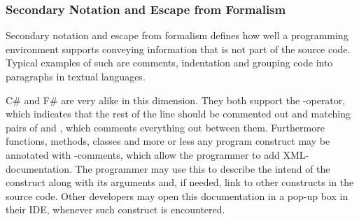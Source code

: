 \subsubsection{Secondary Notation and Escape from Formalism}
Secondary notation and escape from formalism defines how well a programming environment supports conveying information that is not part of the source code. Typical examples of such are comments, indentation and grouping code into paragraphs in textual languages\cite{green1996usability}.

C\# and F\# are very alike in this dimension. They both support the \ttt{//}-operator, which indicates that the rest of the line should be commented out and matching pairs of \ttt{/*} and \ttt{*/}, which comments everything out between them. Furthermore functions, methods, classes and more or less any program construct may be annotated with \ttt{///}-comments, which allow the programmer to add \gls{XML}-documentation\cite{fsharp:xml:doc}. The programmer may use this to describe the intend of the construct along with its arguments and, if needed, link to other constructs in the source code. Other developers may open this documentation in a pop-up box in their \gls{IDE}, whenever such construct is encountered.